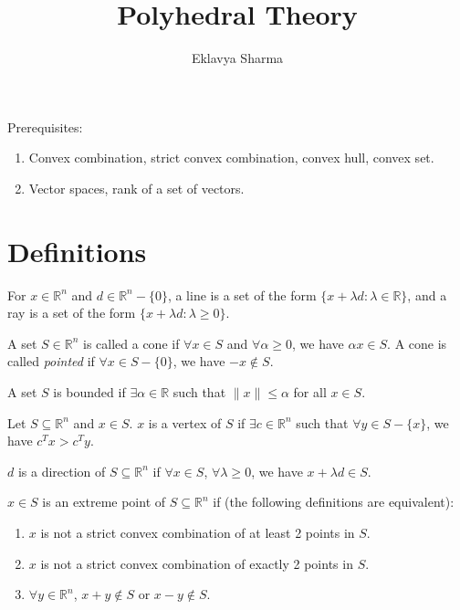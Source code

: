 \documentclass[a4paper, 12pt, fleqn]{article}
\author{Eklavya Sharma}
\date{\empty}
\title{Polyhedral Theory}
\newenvironment*{tightenum}{\begin{enumerate}[noitemsep]}{\end{enumerate}}
\begin{document}
\maketitle
\setlength{\parskip}{0.2em}

Prerequisites:
\begin{tightenum}
\item Convex combination, strict convex combination, convex hull, convex set.
\item Vector spaces, rank of a set of vectors.
\end{tightenum}

\section{Definitions}

\begin{definition}
For $x \in \mathbb{R}^n$ and $d \in \mathbb{R}^n - \{0\}$,
a line is a set of the form $\{x + \lambda d: \lambda \in \mathbb{R}\}$,
and a ray is a set of the form $\{x + \lambda d: \lambda \ge 0\}$.
\end{definition}

\begin{definition}[Cone]
A set $S \in \mathbb{R}^n$ is called a cone if $\forall x \in S$ and $\forall \alpha \ge 0$,
we have $\alpha x \in S$. A cone is called \emph{pointed} if
$\forall x \in S - \{0\}$, we have $-x \not\in S$.
\end{definition}

\begin{definition}
A set $S$ is bounded if $\exists \alpha \in \mathbb{R}$ such that
$\|x\| \le \alpha$ for all $x \in S$.
\end{definition}

\begin{definition}
Let $S \subseteq \mathbb{R}^n$ and $x \in S$.
$x$ is a vertex of $S$ if $\exists c \in \mathbb{R}^n$
such that $\forall y \in S - \{x\}$, we have $c^Tx > c^Ty$.
\end{definition}

\begin{definition}
$d$ is a direction of $S \subseteq \mathbb{R}^n$ if
$\forall x \in S$, $\forall \lambda \ge 0$, we have $x + \lambda d \in S$.
\end{definition}

\begin{definition}
$x \in S$ is an extreme point of $S \subseteq \mathbb{R}^n$ if
(the following definitions are equivalent):
\begin{tightenum}
\item $x$ is not a strict convex combination of at least 2 points in $S$.
\item $x$ is not a strict convex combination of exactly 2 points in $S$.
\item $\forall y \in \mathbb{R}^n$, $x + y \not\in S$ or $x - y \not\in S$.
\end{tightenum}
\end{definition}
\end{document}
